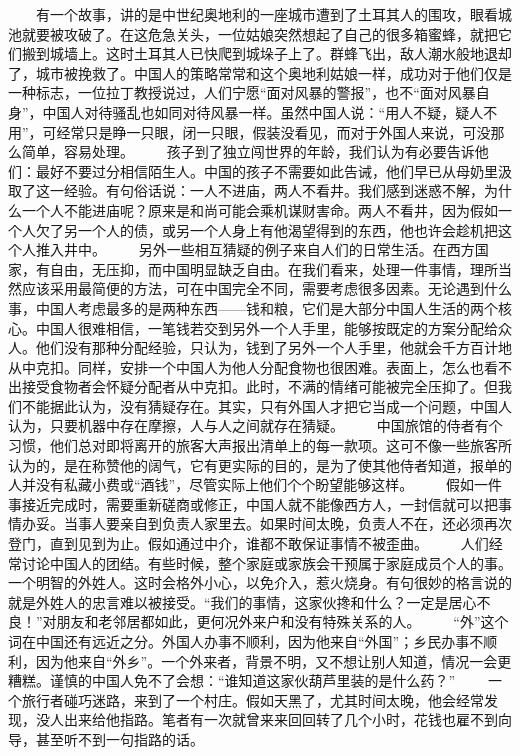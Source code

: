 \documentclass[12pt,oneside]{book}
\begin{document}
\begin{common-format}
　　有一个故事，讲的是中世纪奥地利的一座城市遭到了土耳其人的围攻，眼看城池就要被攻破了。在这危急关头，一位姑娘突然想起了自己的很多箱蜜蜂，就把它们搬到城墙上。这时土耳其人已快爬到城垛子上了。群蜂飞出，敌人潮水般地退却了，城市被挽救了。中国人的策略常常和这个奥地利姑娘一样，成功对于他们仅是一种标志，一位拉丁教授说过，人们宁愿“面对风暴的警报”，也不“面对风暴自身”，中国人对待骚乱也如同对待风暴一样。虽然中国人说：“用人不疑，疑人不用”，可经常只是睁一只眼，闭一只眼，假装没看见，而对于外国人来说，可没那么简单，容易处理。 
　　孩子到了独立闯世界的年龄，我们认为有必要告诉他们：最好不要过分相信陌生人。中国的孩子不需要如此告诫，他们早已从母奶里汲取了这一经验。有句俗话说：一人不进庙，两人不看井。我们感到迷惑不解，为什么一个人不能进庙呢？原来是和尚可能会乘机谋财害命。两人不看井，因为假如一个人欠了另一个人的债，或另一个人身上有他渴望得到的东西，他也许会趁机把这个人推入井中。 
　　另外一些相互猜疑的例子来自人们的日常生活。在西方国家，有自由，无压抑，而中国明显缺乏自由。在我们看来，处理一件事情，理所当然应该采用最简便的方法，可在中国完全不同，需要考虑很多因素。无论遇到什么事，中国人考虑最多的是两种东西——钱和粮，它们是大部分中国人生活的两个核心。中国人很难相信，一笔钱若交到另外一个人手里，能够按既定的方案分配给众人。他们没有那种分配经验，只认为，钱到了另外一个人手里，他就会千方百计地从中克扣。同样，安排一个中国人为他人分配食物也很困难。表面上，怎么也看不出接受食物者会怀疑分配者从中克扣。此时，不满的情绪可能被完全压抑了。但我们不能据此认为，没有猜疑存在。其实，只有外国人才把它当成一个问题，中国人认为，只要机器中存在摩擦，人与人之间就存在猜疑。 
　　中国旅馆的侍者有个习惯，他们总对即将离开的旅客大声报出清单上的每一款项。这可不像一些旅客所认为的，是在称赞他的阔气，它有更实际的目的，是为了使其他侍者知道，报单的人并没有私藏小费或“酒钱”，尽管实际上他们个个盼望能够这样。 
　　假如一件事接近完成时，需要重新磋商或修正，中国人就不能像西方人，一封信就可以把事情办妥。当事人要亲自到负责人家里去。如果时间太晚，负责人不在，还必须再次登门，直到见到为止。假如通过中介，谁都不敢保证事情不被歪曲。 
　　人们经常讨论中国人的团结。有些时候，整个家庭或家族会干预属于家庭成员个人的事。一个明智的外姓人。这时会格外小心，以免介入，惹火烧身。有句很妙的格言说的就是外姓人的忠言难以被接受。“我们的事情，这家伙搀和什么？一定是居心不良！”对朋友和老邻居都如此，更何况外来户和没有特殊关系的人。 
　　“外”这个词在中国还有远近之分。外国人办事不顺利，因为他来自“外国”；乡民办事不顺利，因为他来自“外乡”。一个外来者，背景不明，又不想让别人知道，情况一会更糟糕。谨慎的中国人免不了会想：“谁知道这家伙葫芦里装的是什么药？” 
　　一个旅行者碰巧迷路，来到了一个村庄。假如天黑了，尤其时间太晚，他会经常发现，没人出来给他指路。笔者有一次就曾来来回回转了几个小时，花钱也雇不到向导，甚至听不到一句指路的话。 

\end{common-format}
\end{document}
